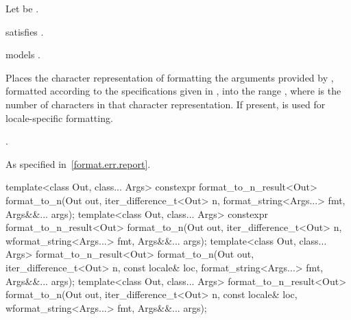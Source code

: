 \begin{itemdescr}
\pnum
Let  be .

\pnum
\constraints
{} satisfies .

\pnum
\expects
{} models .

\pnum
\effects
Places the character representation of formatting
the arguments provided by ,
formatted according to the specifications given in ,
into the range ,
where  is the number of characters in that character representation.
If present,  is used for locale-specific formatting.

\pnum
\returns
{}.

\pnum
\throws
As specified in~\ref{format.err.report}.
\end{itemdescr}

%
\begin{itemdecl}
template<class Out, class... Args>
  constexpr format_to_n_result<Out> format_to_n(Out out, iter_difference_t<Out> n,
                                                format_string<Args...> fmt,
                                                Args&&... args);
template<class Out, class... Args>
  constexpr format_to_n_result<Out> format_to_n(Out out, iter_difference_t<Out> n,
                                                wformat_string<Args...> fmt,
                                                Args&&... args);
template<class Out, class... Args>
  format_to_n_result<Out> format_to_n(Out out, iter_difference_t<Out> n,
                                      const locale& loc, format_string<Args...> fmt,
                                      Args&&... args);
template<class Out, class... Args>
  format_to_n_result<Out> format_to_n(Out out, iter_difference_t<Out> n,
                                      const locale& loc, wformat_string<Args...> fmt,
                                      Args&&... args);
\end{itemdecl}

